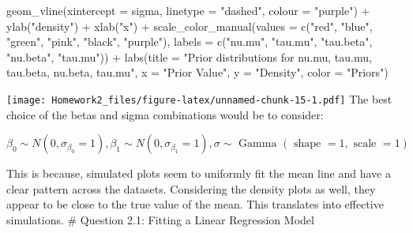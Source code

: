 \documentclass[
]{article}
\newenvironment{Shaded}{\begin{snugshade}}{\end{snugshade}}
\newcommand{\AttributeTok}[1]{\textcolor[rgb]{0.77,0.63,0.00}{#1}}
\newcommand{\DecValTok}[1]{\textcolor[rgb]{0.00,0.00,0.81}{#1}}
\newcommand{\DocumentationTok}[1]{\textcolor[rgb]{0.56,0.35,0.01}{\textbf{\textit{#1}}}}
\newcommand{\FunctionTok}[1]{\textcolor[rgb]{0.00,0.00,0.00}{#1}}
\newcommand{\NormalTok}[1]{#1}
\newcommand{\OtherTok}[1]{\textcolor[rgb]{0.56,0.35,0.01}{#1}}
\newcommand{\SpecialCharTok}[1]{\textcolor[rgb]{0.00,0.00,0.00}{#1}}
\newcommand{\StringTok}[1]{\textcolor[rgb]{0.31,0.60,0.02}{#1}}
\begin{document}
\begin{Shaded}
\begin{Highlighting}[]
  \FunctionTok{geom\_vline}\NormalTok{(}\AttributeTok{xintercept =}\NormalTok{ sigma, }\AttributeTok{linetype =} \StringTok{"dashed"}\NormalTok{, }\AttributeTok{colour =} \StringTok{"purple"}\NormalTok{) }\SpecialCharTok{+}
  \FunctionTok{ylab}\NormalTok{(}\StringTok{"density"}\NormalTok{) }\SpecialCharTok{+} 
  \FunctionTok{xlab}\NormalTok{(}\StringTok{"x"}\NormalTok{) }\SpecialCharTok{+} 
  \FunctionTok{scale\_color\_manual}\NormalTok{(}\AttributeTok{values =} \FunctionTok{c}\NormalTok{(}\StringTok{"red"}\NormalTok{, }\StringTok{"blue"}\NormalTok{, }\StringTok{"green"}\NormalTok{, }\StringTok{"pink"}\NormalTok{, }\StringTok{"black"}\NormalTok{, }\StringTok{"purple"}\NormalTok{), }
                     \AttributeTok{labels =} \FunctionTok{c}\NormalTok{(}\StringTok{"nu.mu"}\NormalTok{, }\StringTok{"tau.mu"}\NormalTok{, }\StringTok{"tau.beta"}\NormalTok{, }\StringTok{"nu.beta"}\NormalTok{, }\StringTok{"tau.mu"}\NormalTok{)) }\SpecialCharTok{+}
  \FunctionTok{labs}\NormalTok{(}\AttributeTok{title =} \StringTok{"Prior distributions for nu.mu, tau.mu, tau.beta, nu.beta, tau.mu"}\NormalTok{,}
       \AttributeTok{x =} \StringTok{"Prior Value"}\NormalTok{,}
       \AttributeTok{y =} \StringTok{"Density"}\NormalTok{,}
       \AttributeTok{color =} \StringTok{"Priors"}\NormalTok{)}
\end{Highlighting}
\end{Shaded}

\texttt{[image: Homework2\_files/figure-latex/unnamed-chunk-15-1.pdf]}
The best choice of the betas and sigma combinations would be to
consider:

\[\begin{equation}
\beta_0 \sim N\left(0, \sigma_{\beta_0}=1\right), \beta_1 \sim N\left(0, \sigma_{\beta_1}=1\right), \sigma \sim \text { Gamma }(\text { shape }=1, \text { scale }=1)
\end{equation}\]

This is because, simulated plots seem to uniformly fit the mean line and
have a clear pattern across the datasets. Considering the density plots
as well, they appear to be close to the true value of the mean. This
translates into effective simulations. \# Question 2.1: Fitting a Linear
Regression Model

\begin{Shaded}
\end{Shaded}
\end{document}
